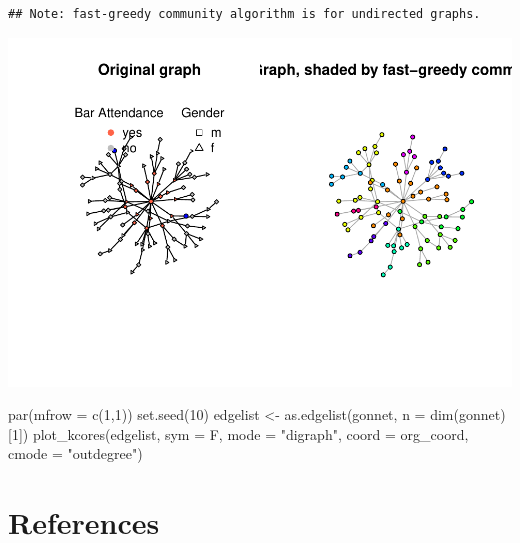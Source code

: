 \documentclass[12pt]{article}
\newenvironment{Shaded}{\begin{snugshade}}{\end{snugshade}}
\newcommand{\AttributeTok}[1]{\textcolor[rgb]{0.77,0.63,0.00}{#1}}
\newcommand{\DecValTok}[1]{\textcolor[rgb]{0.00,0.00,0.81}{#1}}
\newcommand{\FunctionTok}[1]{\textcolor[rgb]{0.00,0.00,0.00}{#1}}
\newcommand{\NormalTok}[1]{#1}
\newcommand{\OtherTok}[1]{\textcolor[rgb]{0.56,0.35,0.01}{#1}}
\newcommand{\StringTok}[1]{\textcolor[rgb]{0.31,0.60,0.02}{#1}}
\begin{document}
\begin{verbatim}
## Note: fast-greedy community algorithm is for undirected graphs.
\end{verbatim}

\includegraphics{JStevenRaquel-paper_files/figure-latex/plotting-fast-greedy-community-1.pdf}

\begin{Shaded}
\begin{Highlighting}[]
\FunctionTok{par}\NormalTok{(}\AttributeTok{mfrow =} \FunctionTok{c}\NormalTok{(}\DecValTok{1}\NormalTok{,}\DecValTok{1}\NormalTok{))}
\FunctionTok{set.seed}\NormalTok{(}\DecValTok{10}\NormalTok{)}
\NormalTok{edgelist }\OtherTok{\textless{}{-}} \FunctionTok{as.edgelist}\NormalTok{(gonnet, }\AttributeTok{n =} \FunctionTok{dim}\NormalTok{(gonnet)[}\DecValTok{1}\NormalTok{])}
\FunctionTok{plot\_kcores}\NormalTok{(edgelist, }\AttributeTok{sym =}\NormalTok{ F, }\AttributeTok{mode =} \StringTok{"digraph"}\NormalTok{, }
            \AttributeTok{coord =}\NormalTok{ org\_coord,}
            \AttributeTok{cmode =} \StringTok{"outdegree"}\NormalTok{)}
\end{Highlighting}
\end{Shaded}

\newpage

\hypertarget{references}{%
\section{References}\label{references}}

\newpage



\end{document}
